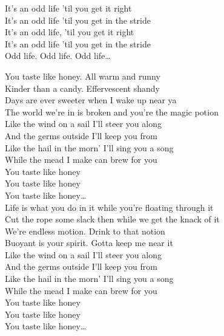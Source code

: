 It's an odd life 'til you get it right \\
It's an odd life 'til you get in the stride \\
It's an odd life, 'til you get it right \\
It's an odd life 'til you get in the stride \\

Odd life. Odd life. Odd life… \\




You taste like honey. All warm and runny \\
Kinder than a candy. Effervescent shandy \\
Days are ever sweeter when I wake up near ya \\
The world we're in is broken and you're the magic potion \\

Like the wind on a sail I'll steer you along \\
And the germs outside I'll keep you from \\
Like the hail in the morn' I'll sing you a song \\
While the mead I make can brew for you \\

You taste like honey \\
You taste like honey \\
You taste like honey… \\

Life is what you do in it while you're floating through it \\
Cut the rope some slack then while we get the knack of it \\
We're endless motion. Drink to that notion \\
Buoyant is your spirit. Gotta keep me near it \\

Like the wind on a sail I'll steer you along \\
And the germs outside I'll keep you from \\
Like the hail in the morn' I'll sing you a song \\
While the mead I make can brew for you \\

You taste like honey \\
You taste like honey \\
You taste like honey… \\

